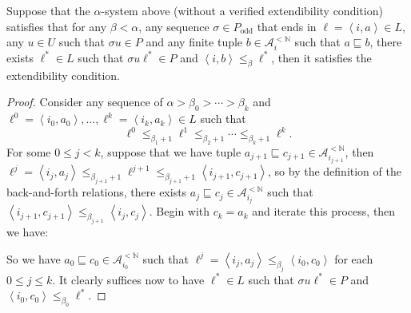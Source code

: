 \documentclass[11pt]{article}
\theoremstyle{plain}
\theoremstyle{definition}
\newcommand{\tuple}[1]{\left\langle #1 \right\rangle}
\begin{document}
\begin{proposition}
  \label{prop:alpha-fr-ext}
  Suppose that the $\alpha$-system above (without a verified extendibility condition) satisfies that for any $\beta < \alpha$, any sequence $\sigma \in P_\text{odd}$ that ends in $\ell = \tuple{i, a} \in L$, any $u \in U$ such that $\sigma u \in P$ and any finite tuple $b \in \mathcal{A}_i^{<\mathbb{N}}$ such that $a \sqsubseteq b$, there exists $\ell^* \in L$ such that $\sigma u \ell^* \in P$ and $\tuple{i, b} \leq_\beta \ell^*$, then it satisfies the extendibility condition.
\end{proposition}

\begin{proof}
  Consider any sequence of $\alpha > \beta_0 > \cdots > \beta_k$ and $\ell^0 = \tuple{i_0, a_0}, \ldots, \ell^k = \tuple{i_k, a_k} \in L$ such that
  \[\ell^0 \leq_{\beta_1 + 1} \ell^1 \leq_{\beta_2 + 1} \cdots \leq_{\beta_k + 1} \ell^k.\]
  For some $0 \leq j < k$, suppose that we have tuple $a_{j + 1} \sqsubseteq c_{j + 1} \in \mathcal{A}_{i_{j + 1}}^{<\mathbb{N}}$, then $\ell^j = \tuple{i_j, a_j} \leq_{\beta_{j + 1} + 1} \ell^{j + 1} \leq_{\beta_{j + 1} + 1} \tuple{i_{j + 1}, c_{j + 1}}$, so by the definition of the back-and-forth relations, there exists $a_j \sqsubseteq c_j \in \mathcal{A}_{i_j}^{<\mathbb{N}}$ such that $\tuple{i_{j + 1}, c_{j + 1}} \leq_{\beta_{j + 1}} \tuple{i_j, c_j}$. Begin with $c_k = a_k$ and iterate this process, then we have:
  \begin{center}
  \end{center}
  So we have $a_0 \sqsubseteq c_0 \in \mathcal{A}_{i_0}^{<\mathbb{N}}$ such that $\ell^j = \tuple{i_j, a_j} \leq_{\beta_j} \tuple{i_0, c_0}$ for each $0 \leq j \leq k$. It clearly suffices now to have $\ell^* \in L$ such that $\sigma u \ell^* \in P$ and $\tuple{i_0, c_0} \leq_{\beta_0} \ell^*$.
\end{proof}
\end{document}
